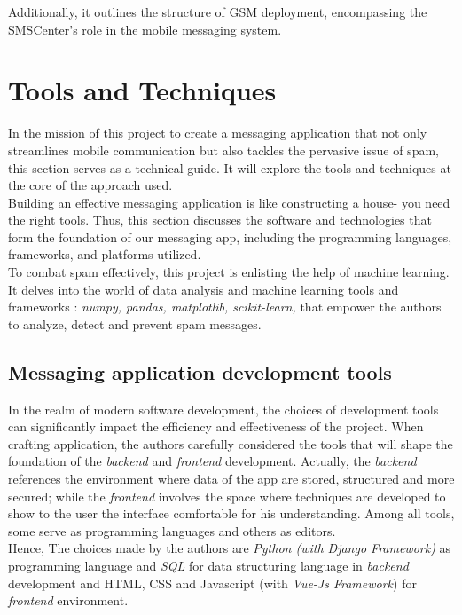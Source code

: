 \documentclass[12pt,a4paper, oneside]{book}
\begin{document}
    Additionally, it outlines the structure of GSM deployment, encompassing the SMSCenter's role in the mobile messaging system.
   
   
    
   \section{Tools and Techniques} 
	In the mission of this project to create a messaging application that not only streamlines mobile communication but also tackles the pervasive issue of spam, this section serves as a technical guide. It will explore the tools and techniques at the core of the approach used. \\
		
	Building an effective messaging application is like constructing a house- you need the right tools. Thus, this section discusses the software and technologies that form the foundation of our messaging app, including the programming languages, frameworks, and platforms utilized. \\
	
	To combat spam effectively, this project is enlisting the help of machine learning. It delves into the world of data analysis and machine learning tools and frameworks : \textit{numpy, pandas, matplotlib, scikit-learn,} that empower the authors to analyze, detect and prevent spam messages.\\
	
	\subsection{Messaging application development tools}
	In the realm of modern software development, the choices of development tools can significantly impact the efficiency and effectiveness of the project. When crafting application, the authors carefully considered the tools that will shape the foundation of the \textit{backend} and \textit{frontend} development. Actually, the \textit{backend} references the environment where data of the app are stored, structured and more secured; while the \textit{frontend} involves the space where techniques are developed to show to the user the interface comfortable for his understanding. Among all tools, some serve as programming languages and others as editors. \\ 
	
	Hence, The choices made by the authors are \textit{Python (with Django \textit{Framework})} as programming language and \textit{SQL} for data structuring language in \textit{backend} development and HTML, CSS and Javascript (with \textit{Vue-Js Framework}) for \textit{frontend} environment. \\
	
\end{document}
